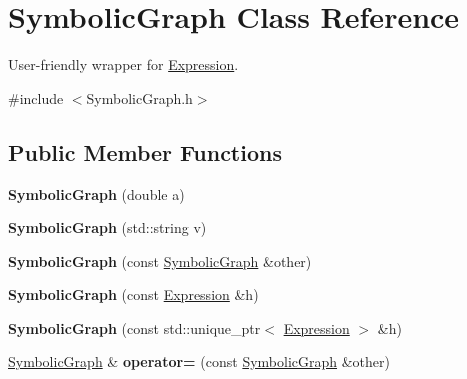 \hypertarget{classSymbolicGraph}{}\section{Symbolic\+Graph Class Reference}
\label{classSymbolicGraph}


User-\/friendly wrapper for \hyperlink{classExpression}{Expression}.  




{\ttfamily \#include $<$Symbolic\+Graph.\+h$>$}

\subsection*{Public Member Functions}
\begin{DoxyCompactItemize}
\item 
{\bfseries Symbolic\+Graph} (double a)\hypertarget{classSymbolicGraph_a4f827886f1d03372bd38b018acc8d47c}{}\label{classSymbolicGraph_a4f827886f1d03372bd38b018acc8d47c}

\item 
{\bfseries Symbolic\+Graph} (std\+::string v)\hypertarget{classSymbolicGraph_a851bbbf41cfb63463be1b758992276a0}{}\label{classSymbolicGraph_a851bbbf41cfb63463be1b758992276a0}

\item 
{\bfseries Symbolic\+Graph} (const \hyperlink{classSymbolicGraph}{Symbolic\+Graph} \&other)\hypertarget{classSymbolicGraph_a429d10d3eb7617ab6a888d5a911ce8aa}{}\label{classSymbolicGraph_a429d10d3eb7617ab6a888d5a911ce8aa}

\item 
{\bfseries Symbolic\+Graph} (const \hyperlink{classExpression}{Expression} \&h)\hypertarget{classSymbolicGraph_a311c2b21f12aa637b8c4071269f08f1f}{}\label{classSymbolicGraph_a311c2b21f12aa637b8c4071269f08f1f}

\item 
{\bfseries Symbolic\+Graph} (const std\+::unique\+\_\+ptr$<$ \hyperlink{classExpression}{Expression} $>$ \&h)\hypertarget{classSymbolicGraph_aa3da5bda41d3ef3f2dab310c08614d0c}{}\label{classSymbolicGraph_aa3da5bda41d3ef3f2dab310c08614d0c}

\item 
\hyperlink{classSymbolicGraph}{Symbolic\+Graph} \& {\bfseries operator=} (const \hyperlink{classSymbolicGraph}{Symbolic\+Graph} \&other)\hypertarget{classSymbolicGraph_ac5fda8a03a15aa8b561f3b93d7465de0}{}\label{classSymbolicGraph_ac5fda8a03a15aa8b561f3b93d7465de0}


\end{DoxyCompactItemize}
